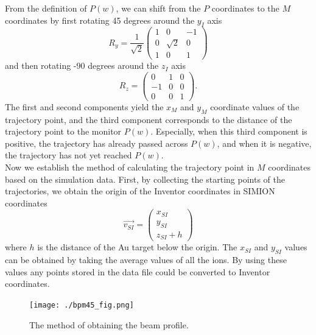 \documentclass{article}
\begin{document}
From the definition of $P(w)$, we can shift from the $P$ coordinates to the $M$ coordinates by first rotating 45 degrees around the $y_I$ axis
\begin{equation*}
R_y = \frac{1}{\sqrt{2}} \left(
\begin{array}{ccc}
	1 & 0 & -1 \\
	0 & \sqrt{2} & 0 \\
	1 & 0 & 1
\end{array} \right)
\end{equation*}
and then rotating -90 degrees around the $z_I$ axis
\begin{equation*}
R_z = \left(
\begin{array}{ccc}
	0 & 1 & 0 \\
	-1 & 0 & 0 \\
	0 & 0 & 1
\end{array} \right).
\end{equation*}
The first and second components yield the $x_M$ and $y_M$ coordinate values of the trajectory point, and the third component corresponds to the distance of the trajectory point to the monitor $P(w)$. Especially, when this third component is positive, the trajectory has already passed across $P(w)$, and when it is negative, the trajectory has not yet reached $P(w)$. \\

Now we establish the method of calculating the trajectory point in $M$ coordinates based on the simulation data. First, by collecting the starting points of the trajectories, we obtain the origin of the Inventor coordinates in SIMION coordinates
\begin{equation*}
\vec{v_{SI}} = \left(
\begin{array}{c}
	x_{SI} \\
	y_{SI} \\
	z_{SI} + h
\end{array} \right)
\end{equation*}
where $h$ is the distance of the Au target below the origin. The $x_{SI}$ and $y_{SI}$ values can be obtained by taking the average values of all the ions. By using these values any points stored in the data file could be converted to Inventor coordinates. \\

\begin{figure}[H]
  \begin{center}
    \texttt{[image: ./bpm45\_fig.png]}
    \caption{The method of obtaining the beam profile.}
    \label{fig:bpm45_fig}
  \end{center}
\end{figure}
\end{document}

